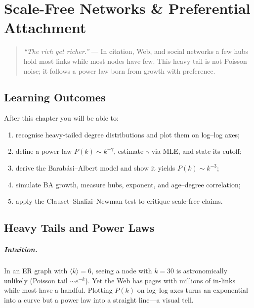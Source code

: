 \chapter{Scale-Free Networks \& Preferential Attachment}
\label{ch:scalefree}
\sloppy

\begin{quote}
\emph{``The rich get richer.''} --- In citation, Web, and social networks a few hubs hold most links while most nodes have few. This heavy tail is not Poisson noise; it follows a power law born from growth with preference.
\end{quote}

\noindent{}
\vspace{0.4em}

\section*{Learning Outcomes}
After this chapter you will be able to:
\begin{enumerate}[label=(L\arabic*)]
    \item recognise heavy-tailed degree distributions and plot them on log--log axes;
    \item define a power law $P(k)\sim k^{-\gamma}$, estimate $\gamma$ via MLE, and state its cutoff;
    \item derive the Barab\'asi--Albert model and show it yields $P(k)\sim k^{-3}$;
    \item simulate BA growth, measure hubs, exponent, and age--degree correlation;
    \item apply the Clauset--Shalizi--Newman test to critique scale-free claims.
\end{enumerate}

\section{Heavy Tails and Power Laws}
\label{sec:heavy-tails}
\paragraph{Intuition.} In an ER graph with $\langle k\rangle=6$, seeing a node with $k=30$ is astronomically unlikely (Poisson tail $\sim e^{-k}$). Yet the Web has pages with millions of in-links while most have a handful. Plotting $P(k)$ on log--log axes turns an exponential into a curve but a power law into a straight line---a visual tell.

